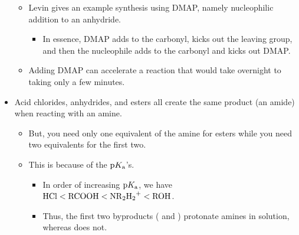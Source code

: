 \documentclass[../notes.tex]{subfiles}
\begin{document}
\begin{itemize}
    \begin{itemize}
        \item Levin gives an example synthesis using DMAP, namely nucleophilic addition to an anhydride.
        \begin{itemize}
            \item In essence, DMAP adds to the carbonyl, kicks out the leaving group, and then the nucleophile adds to the carbonyl and kicks out DMAP.
        \end{itemize}
        \item Adding DMAP can accelerate a reaction that would take overnight to taking only a few minutes.
    \end{itemize}
    \item Acid chlorides, anhydrides, and esters all create the same product (an amide) when reacting with an amine.
    \begin{itemize}
        \item But, you need only one equivalent of the amine for esters while you need two equivalents for the first two.
        \item This is because of the $\text{p}K_\text{a}$'s.
        \begin{itemize}
            \item In order of increasing $\text{p}K_\text{a}$, we have $\ce{HCl}<\ce{RCOOH}<\ce{NR2H2+}<\ce{ROH}$.
            \item Thus, the first two byproducts ( and ) protonate amines in solution, whereas  does not.
        \end{itemize}
    \end{itemize}
\end{itemize}
\end{document}
